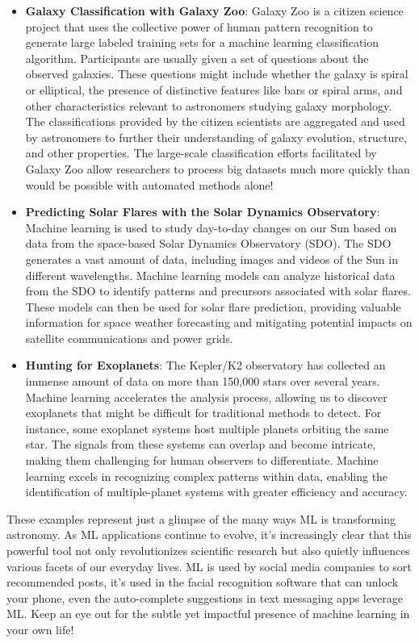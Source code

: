\begin{itemize}
    \item \textbf{Galaxy Classification with Galaxy Zoo}: Galaxy Zoo is a citizen science project that uses the collective power of human pattern recognition to generate large labeled training sets for a machine learning classification algorithm. Participants are usually given a set of questions about the observed galaxies. These questions might include whether the galaxy is spiral or elliptical, the presence of distinctive features like bars or spiral arms, and other characteristics relevant to astronomers studying galaxy morphology. The classifications provided by the citizen scientists are aggregated and used by astronomers to further their understanding of galaxy evolution, structure, and other properties. The large-scale classification efforts facilitated by Galaxy Zoo allow researchers to process big datasets much more quickly than would be possible with automated methods alone! 
    \item \textbf{Predicting Solar Flares with the Solar Dynamics Observatory}: Machine learning is used to study day-to-day changes on our Sun based on data from the space-based Solar Dynamics Observatory (SDO). The SDO generates a vast amount of data, including images and videos of the Sun in different wavelengths. Machine learning models can analyze historical data from the SDO to identify patterns and precursors associated with solar flares. These models can then be used for solar flare prediction, providing valuable information for space weather forecasting and mitigating potential impacts on satellite communications and power grids.
    \item \textbf{Hunting for Exoplanets}: The Kepler/K2 observatory has collected an immense amount of data on more than 150,000 stars over several years. Machine learning accelerates the analysis process, allowing us to discover exoplanets that might be difficult for traditional methods to detect. For instance, some exoplanet systems host multiple planets orbiting the same star. The signals from these systems can overlap and become intricate, making them challenging for human observers to differentiate. Machine learning excels in recognizing complex patterns within data, enabling the identification of multiple-planet systems with greater efficiency and accuracy.

\end{itemize}


These examples represent just a glimpse of the many ways ML is transforming astronomy. As ML applications continue to evolve, it's increasingly clear that this powerful tool not only revolutionizes scientific research but also quietly influences various facets of our everyday lives. ML is used by social media companies to sort recommended posts, it's used in the facial recognition software that can unlock your phone, even the auto-complete suggestions in text messaging apps leverage ML. Keep an eye out for the subtle yet impactful presence of machine learning in your own life! 